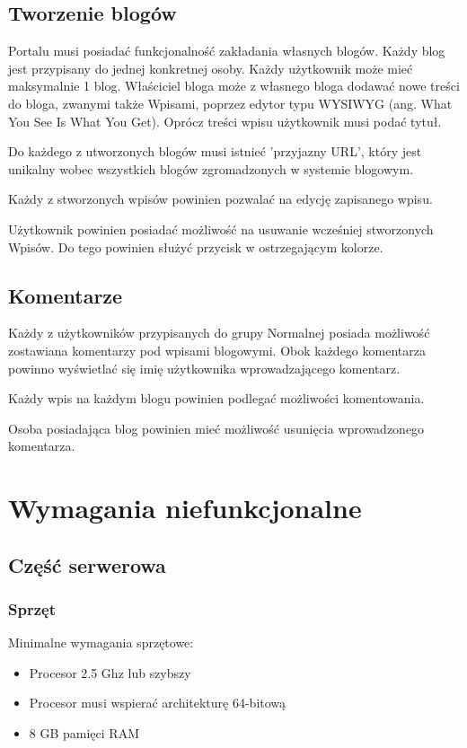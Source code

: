 \documentclass{article}
\begin{document}
\subsection{Tworzenie blogów}
Portalu musi posiadać funkcjonalność zakładania własnych blogów. Każdy blog jest przypisany do jednej konkretnej osoby. Każdy użytkownik może mieć maksymalnie 1 blog. Właściciel bloga może z własnego bloga dodawać nowe treści do bloga, zwanymi także Wpisami, poprzez edytor typu WYSIWYG (ang. What You See Is What You Get). Oprócz treści wpisu użytkownik musi podać tytuł.

Do każdego z utworzonych blogów musi istnieć 'przyjazny URL', który jest unikalny wobec wszystkich blogów zgromadzonych w systemie blogowym.

Każdy z stworzonych wpisów powinien pozwalać na edycję zapisanego wpisu.

Użytkownik powinien posiadać możliwość na usuwanie wcześniej stworzonych Wpisów. Do tego powinien służyć przycisk w ostrzegającym kolorze.

\subsection{Komentarze}
Każdy z użytkowników przypisanych do grupy Normalnej posiada możliwość zostawiana komentarzy pod wpisami blogowymi.  Obok każdego komentarza powinno wyświetlać się imię użytkownika wprowadzającego komentarz.

Każdy wpis na każdym blogu powinien podlegać możliwości komentowania.

Osoba posiadająca blog powinien mieć możliwość usunięcia wprowadzonego komentarza.

\section{Wymagania niefunkcjonalne}
\subsection{Część serwerowa}


\subsubsection{Sprzęt}
Minimalne wymagania sprzętowe:
\begin{itemize}
\item Procesor 2.5 Ghz lub szybszy
\item Procesor musi wspierać architekturę 64-bitową
\item 8 GB pamięci RAM
\end{itemize}
\end{document}
